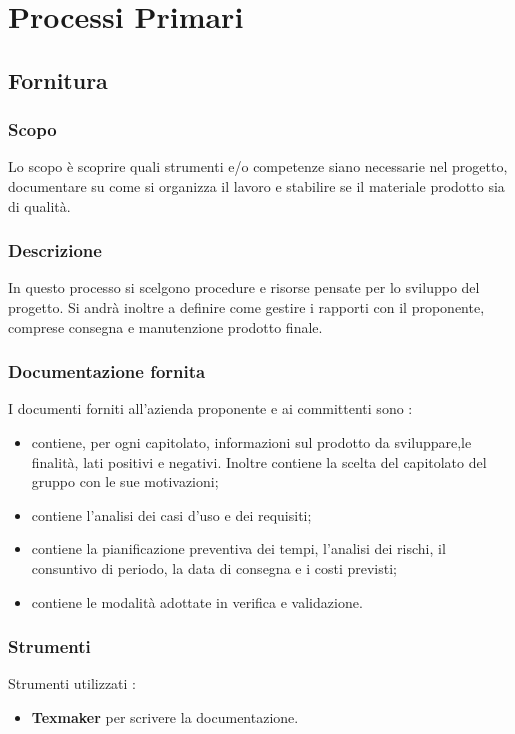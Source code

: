 \section{Processi Primari}
\subsection{Fornitura}
\subsubsection{Scopo}
Lo scopo è scoprire quali strumenti e/o competenze siano necessarie nel progetto, documentare su come si organizza il lavoro e stabilire se il materiale prodotto sia di qualità.

\subsubsection{Descrizione}
In questo processo si scelgono procedure e risorse pensate per lo sviluppo del progetto. Si andrà inoltre a definire come gestire i rapporti con il proponente, comprese consegna e manutenzione prodotto finale.

\subsubsection{Documentazione fornita}
I documenti forniti all’azienda proponente e ai committenti sono :
\begin{itemize}
  \item \textbf{\SdF} contiene, per ogni capitolato, informazioni sul prodotto da sviluppare,le finalità, lati positivi e negativi. Inoltre contiene la scelta del capitolato del gruppo con le sue motivazioni;

  \item \textbf{\AdR} contiene l’analisi dei casi d’uso e dei requisiti;

  \item \textbf{\PdP} contiene la pianificazione preventiva dei tempi, l’analisi dei rischi, il consuntivo di periodo, la data di consegna e i costi previsti;

  \item \textbf{\PdQ} contiene le modalità adottate in verifica e validazione.

\end{itemize}
\subsubsection{Strumenti}
Strumenti utilizzati :
\begin{itemize}
  \item \textbf{Texmaker} per scrivere la documentazione.
\end{itemize}

